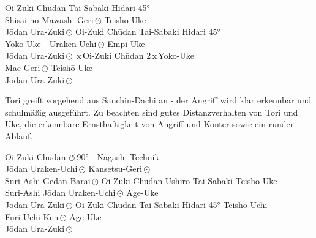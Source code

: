 \newcommand{\zwitepf}{\begin{pfbox}
		Tori greift vorgehend aus Sanchin-Dachi an - der Angriff wird klar erkennbar und schulmäßig ausgeführt. Zu beachten sind gutes Distanzverhalten von Tori und Uke, die erkennbare Ernsthaftigkeit von Angriff und Konter sowie ein runder Ablauf.
\end{pfbox}}
\setcounter{num}{0}
\setcounter{numz}{0}
\begin{tcbitemize}[right=4pt,left=4pt,raster columns=3,raster equal height,colframe=GKD,colback=white,fonttitle=\bfseries]
	\tcbitem[squeezed title*={Kumite Ura 1}]
	Oi-Zuki Ch\={u}dan
	Tai-Sabaki Hidari 45°\\
	Shisai no Mawashi Geri\,\(\odot\)
	Teish\={o}-Uke\\
	J\={o}dan Ura-Zuki\,\(\odot\)
	\tcbitem[squeezed title*={Kumite Ura 2}]
	Oi-Zuki Ch\={u}dan
	Tai-Sabaki Hidari 45°\\
	Yoko-Uke - Uraken-Uchi\,\(\odot\)
	Empi-Uke\\
	J\={o}dan Ura-Zuki\,\(\odot\)
	\,x\,Oi-Zuki Ch\={u}dan
	2\,x\,Yoko-Uke\\
	Mae-Geri\,\(\odot\)
	Teish\={o}-Uke\\
	J\={o}dan Ura-Zuki\,\(\odot\)
\end{tcbitemize}
\null\vfill\null
\zwitepf
\null\vfill\null
\begin{tcbitemize}[right=4pt,left=4pt,raster columns=3,raster equal height,colframe=GKD,colback=white,fonttitle=\bfseries]
	\tcbitem[squeezed title*={Kumite Ura 4}]
	Oi-Zuki Ch\={u}dan
	\(\circlearrowleft\)\,90° - Nagashi Technik\\
	J\={o}dan Uraken-Uchi\,\(\odot\)
	Kansetsu-Geri\,\(\odot\)\\
	Suri-Ashi Gedan-Barai\,\(\odot\)
	\tcbitem[squeezed title*={Kumite Ura 5}]
	Oi-Zuki Ch\={u}dan
	Ushiro Tai-Sabaki Teish\={o}-Uke\\
	Suri-Ashi J\={o}dan Uraken-Uchi\,\(\odot\)
	Age-Uke\\
	J\={o}dan Ura-Zuki\,\(\odot\)
	\tcbitem[squeezed title*={Kumite Ura 6}]
	Oi-Zuki Ch\={u}dan
	Tai-Sabaki Hidari 45° Teish\={o}-Uchi\\
	Furi-Uchi-Ken\,\(\odot\)
	Age-Uke\\
	J\={o}dan Ura-Zuki\,\(\odot\)
\end{tcbitemize}
